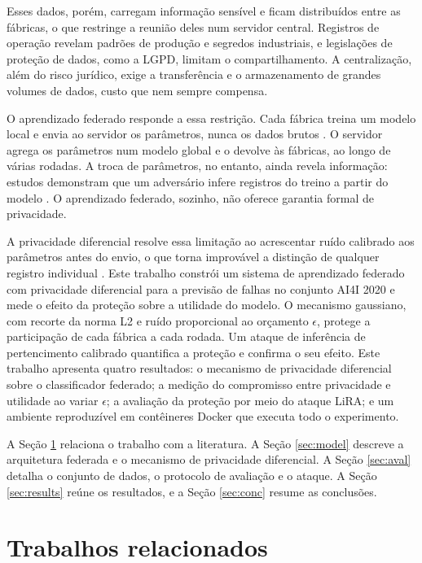 \documentclass[12pt]{article}
\begin{document}
Esses dados, porém, carregam informação sensível e ficam distribuídos entre as
fábricas, o que restringe a reunião deles num servidor central. Registros de
operação revelam padrões de produção e segredos industriais, e legislações de
proteção de dados, como a LGPD, limitam o compartilhamento. A centralização, além do
risco jurídico, exige a transferência e o armazenamento de grandes volumes de dados,
custo que nem sempre compensa.

O aprendizado federado responde a essa restrição. Cada fábrica treina um modelo
local e envia ao servidor os parâmetros, nunca os dados brutos
\cite{mcmahan2017fedavg}. O servidor agrega os parâmetros num modelo global e o
devolve às fábricas, ao longo de várias rodadas. A troca de parâmetros, no entanto, ainda
revela informação: estudos demonstram que um adversário infere registros do treino a
partir do modelo \cite{shokri2017membership}. O aprendizado federado, sozinho, não
oferece garantia formal de privacidade.

A privacidade diferencial resolve essa limitação ao acrescentar ruído calibrado aos
parâmetros antes do envio, o que torna improvável a distinção de qualquer registro
individual \cite{dwork2014foundations}. Este trabalho constrói um sistema de
aprendizado federado com privacidade diferencial para a previsão de falhas no
conjunto AI4I 2020 \cite{matzka2020explainable} e mede o efeito da proteção sobre a
utilidade do modelo. O mecanismo gaussiano, com recorte da norma L2 e ruído
proporcional ao orçamento $\epsilon$, protege a participação de cada fábrica a cada
rodada. Um ataque de inferência de pertencimento calibrado \cite{carlini2022membership}
quantifica a proteção e confirma o seu efeito. Este trabalho apresenta quatro
resultados: o mecanismo de privacidade diferencial sobre o classificador federado; a
medição do compromisso entre privacidade e utilidade ao variar $\epsilon$; a
avaliação da proteção por meio do ataque LiRA; e um ambiente reproduzível em
contêineres Docker que executa todo o experimento.

A Seção \ref{sec:trabRel} relaciona o trabalho com a literatura. A Seção \ref{sec:model}
descreve a arquitetura federada e o mecanismo de privacidade diferencial. A Seção
\ref{sec:aval} detalha o conjunto de dados, o protocolo de avaliação e o ataque. A
Seção \ref{sec:results} reúne os resultados, e a Seção \ref{sec:conc} resume as
conclusões.

\section{Trabalhos relacionados} \label{sec:trabRel}
\end{document}
